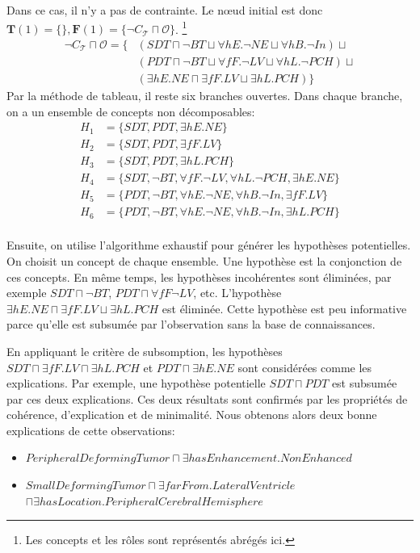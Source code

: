 \documentclass{article}
\begin{document}
Dans ce cas, il n'y a pas de contrainte. Le n{\oe}ud initial est donc $\mathbf{T}(1)=\{\}, \mathbf{F}(1)=\{\neg C_\mathcal{T}\sqcap \mathcal{O}\}$.
\footnote{Les concepts et les rôles sont représentés abrégés ici.}\vspace{-0.3cm}
\begin{align*}
 \neg C_\mathcal{T}\sqcap \mathcal{O}= \{ &(SDT \sqcap \neg BT \sqcup \forall hE. \neg NE \sqcup \forall hB. \neg In) \sqcup \\
 &(PDT \sqcap \neg BT \sqcup \forall fF. \neg LV \sqcup \forall hL. \neg PCH) \sqcup \\
 &(\exists hE. NE \sqcap \exists fF. LV \sqcup \exists hL.PCH )\}
\end{align*}
Par la méthode de tableau, il reste six branches ouvertes. Dans chaque branche, on a un ensemble de concepts
non décomposables:\vspace{-0.25cm}
 \begin{align*}
  H_1&=\{ SDT, PDT, \exists hE.NE\}\\
  H_2&=\{ SDT, PDT, \exists fF.LV\}\\
  H_3&=\{ SDT, PDT, \exists hL.PCH\}\\
  H_4&=\{ SDT, \neg BT, \forall fF. \neg LV, \forall hL. \neg PCH, \exists hE.NE\}\\
  H_5&=\{ PDT, \neg BT, \forall hE. \neg NE, \forall hB. \neg In, \exists fF.LV\}\\
  H_6&=\{ PDT, \neg BT, \forall hE. \neg NE, \forall hB. \neg In, \exists hL.PCH\}\\
 \end{align*}\vspace{-0.9cm}

Ensuite, on utilise l'algorithme exhaustif pour générer les hypothèses potentielles.
On choisit un concept de chaque ensemble. Une hypothèse est la conjonction de ces concepts.
En même temps, les hypothèses incohérentes sont éliminées, par exemple $SDT \sqcap \neg BT$, 
$PDT \sqcap \forall fF \neg LV$, etc. L'hypothèse $\exists hE. NE \sqcap \exists fF. LV \sqcup \exists hL.PCH $
est éliminée. Cette hypothèse est peu informative parce qu'elle est subsumée par l'observation sans la base de connaissances.

En appliquant le critère de subsomption, les hypothèses $SDT \sqcap \exists fF.LV \sqcap \exists hL.PCH$
et $PDT \sqcap \exists hE.NE$ sont considérées comme les explications. Par exemple, une hypothèse potentielle
$SDT \sqcap PDT$ est subsumée par ces deux explications. Ces deux résultats sont confirmés par les propriétés
de cohérence, d'explication et de minimalité. Nous obtenons alors deux bonne explications de cette observations:
\begin{itemize}
 \item $PeripheralDeformingTumor \sqcap \exists hasEnhancement. NonEnhanced$
 \item $SmallDeformingTumor\sqcap \exists farFrom. LateralVentricle $\\ $\sqcap \exists hasLocation. PeripheralCerebralHemisphere$
\end{itemize}
\end{document}
